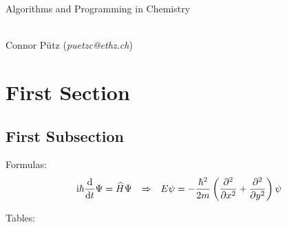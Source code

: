 \documentclass[a4paper,11pt]{scrartcl}
\begin{document}
    
\thispagestyle{empty}

\begin{center}
    \begin{LARGE}\sectfont
        Algorithms and Programming in Chemistry
    \end{LARGE}\\
    \vspace{0.5cm}
        Connor Pütz (\textit{puetzc@ethz.ch})\\
    \vspace{1cm}
\end{center}

\tableofcontents

\newpage\section{First Section}

    \subsection{First Subsection}


    Formulas:
    \begin{align}
        &\mathrm{i}\hbar\frac{\mathrm{d}}{\mathrm{d}t}\mathrm{\Psi}=\widehat{H}\mathrm{\Psi}&\Rightarrow&&E\psi=-\frac{\hbar^2}{2m}\left(\frac{\partial ^2}{\partial x^2}+\frac{\partial ^2}{\partial y^2}\right)\psi
    \end{align}

    Tables:
    
\end{document}
